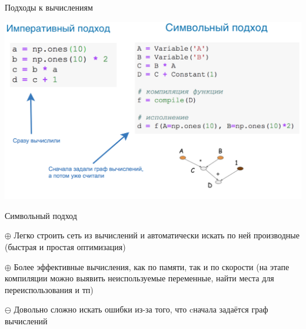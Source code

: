 \documentclass[notes,12pt, aspectratio=169]{beamer}
\newenvironment{wideitemize}{\itemize\addtolength{\itemsep}{10pt}}{\enditemize}
\begin{document}
\begin{frame}{Подходы к вычислениям}
\begin{center}
	\includegraphics[width=.85\linewidth]{graph.png}
\end{center}
\end{frame} 


\begin{frame}{Символьный подход}
\begin{wideitemize}
\item[$\oplus$] Легко строить сеть из вычислений и автоматически искать по ней производные \alert{(быстрая и простая оптимизация)}

\item[$\oplus$] Более эффективные вычисления, как по памяти, так и по скорости (на этапе компиляции можно выявить неиспользуемые переменные, найти места для переиспользования и тп) 

\item[$\ominus$] Довольно сложно искать ошибки из-за того, что cначала задаётся граф вычислений
\end{wideitemize}
\end{frame} 


\end{document}

